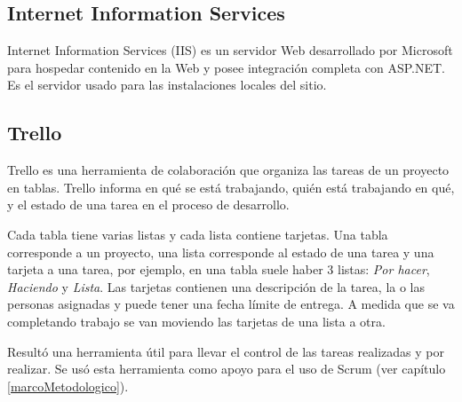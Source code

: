 \subsection{Internet Information Services}
Internet Information Services (IIS) es un servidor Web desarrollado por Microsoft para hospedar contenido en la Web \cite{IISMicrosoft} y posee integración completa con ASP.NET. Es el servidor usado para las instalaciones locales del sitio.

\subsection{Trello}
Trello es una herramienta de colaboración que organiza las tareas de un proyecto en tablas. Trello informa en qué se está trabajando, quién está trabajando en qué, y el estado de una tarea en el proceso de desarrollo.

Cada tabla tiene varias listas y cada lista contiene tarjetas. Una tabla corresponde a un proyecto, una lista corresponde al estado de una tarea y una tarjeta a una tarea, por ejemplo, en una tabla suele haber 3 listas: \emph{Por hacer}, \emph{Haciendo} y \emph{Lista}. Las tarjetas contienen una descripción de la tarea, la o las personas asignadas y puede tener una fecha límite de entrega. A medida que se va completando trabajo se van moviendo las tarjetas de una lista a otra.

Resultó una herramienta útil para llevar el control de las tareas realizadas y por realizar. Se usó esta herramienta como apoyo para el uso de Scrum (ver capítulo \ref{marcoMetodologico}).